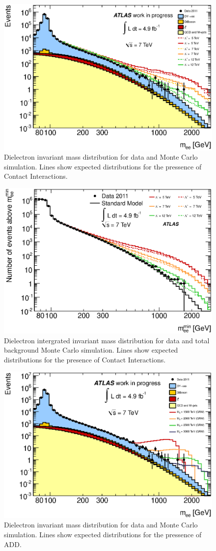 	\begin{figure}[h!p]
	\centering
	\includegraphics[width=0.7\linewidth]{images/inv_mass.eps}
	\caption{Dielectron invariant mass distribution for data and Monte Carlo simulation. Lines show expected distributions for the pressence of Contact Interactions.}
	\label{fig:CIinvMass}
	\end{figure}

	\begin{figure}[h!p]
	\centering
	\includegraphics[width=0.7\linewidth]{images/int_inv_mass.eps}
	\caption{Dielectron intergrated invariant mass distribution for data and total background Monte Carlo simulation. Lines show expected distributions for the presence of Contact Interactions.}
	\label{fig:CIintinvMass}
	\end{figure}

	\begin{figure}[h!p]
	\centering
	\includegraphics[width=0.7\linewidth]{images/ADD_inv_mass.eps}
	\caption{Dielectron invariant mass distribution for data and Monte Carlo simulation. Lines show expected distributions for the pressence of ADD.}
	\label{fig:ADDinvMass}
	\end{figure}

